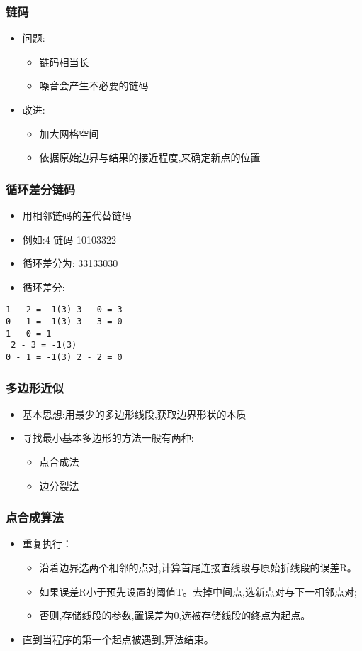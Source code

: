 \documentclass{beamer}
\begin{document}
\begin{frame}
\frametitle{链码}
\label{sec-2-4}

\begin{itemize}
\item 问题:
\begin{itemize}
\item 链码相当长
\item 噪音会产生不必要的链码
\end{itemize}
\item 改进:
\begin{itemize}
\item 加大网格空间
\item 依据原始边界与结果的接近程度,来确定新点的位置
\end{itemize}
\end{itemize}
\end{frame}
\begin{frame}[fragile]
\frametitle{循环差分链码}
\label{sec-2-5}

\begin{itemize}
\item 用相邻链码的差代替链码
\item 例如:4-链码 10103322
\item 循环差分为: 33133030
\item 循环差分:
\end{itemize}

\begin{verbatim}
1 - 2 = -1(3) 3 - 0 = 3
0 - 1 = -1(3) 3 - 3 = 0
1 - 0 = 1
 2 - 3 = -1(3)
0 - 1 = -1(3) 2 - 2 = 0
\end{verbatim}
\end{frame}
\begin{frame}
\frametitle{多边形近似}
\label{sec-2-6}

\begin{itemize}
\item 基本思想:用最少的多边形线段,获取边界形状的本质
\item 寻找最小基本多边形的方法一般有两种:
\begin{itemize}
\item 点合成法
\item 边分裂法
\end{itemize}
\end{itemize}
\end{frame}
\begin{frame}
\frametitle{点合成算法}
\label{sec-2-7}

\begin{itemize}
\item 重复执行：
\begin{itemize}
\item 沿着边界选两个相邻的点对,计算首尾连接直线段与原始折线段的误差R。
\item 如果误差R小于预先设置的阈值T。去掉中间点,选新点对与下一相邻点对;
\item 否则,存储线段的参数,置误差为0,选被存储线段的终点为起点。
\end{itemize}
\item 直到当程序的第一个起点被遇到,算法结束。
\end{itemize}
\end{frame}
\end{document}
